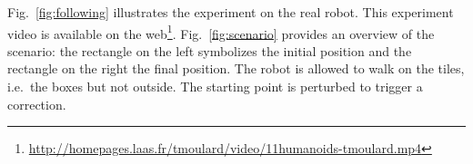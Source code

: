 Fig.~\ref{fig:following} illustrates the experiment on the real
robot. This experiment video is available on the
web\footnote{\mbox{\url{http://homepages.laas.fr/tmoulard/video/11humanoids-tmoulard.mp4}}}. Fig.~\ref{fig:scenario}
provides an overview of the scenario: the rectangle on the left
symbolizes the initial position and the rectangle on the right the
final position. The robot is allowed to walk on the tiles, i.e.\ the
boxes but not outside. The starting point is perturbed to trigger a
correction.


\FloatBarrier

